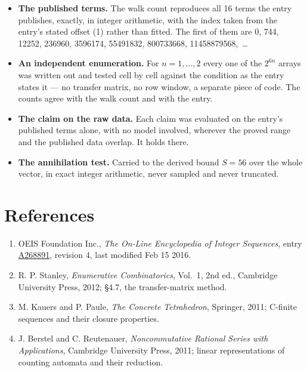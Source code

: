 \documentclass[11pt]{article}
\theoremstyle{definition}
\begin{document}
\begin{itemize}

\item {\bfseries The published terms.} The walk count reproduces all 16 terms the entry publishes, exactly, in integer arithmetic, with the index taken from the entry's stated offset (1) rather than fitted. The first of them are 0, 744, 12252, 236960, 3596174, 55491832, 800733668, 11458879568,~\dots

\item {\bfseries An independent enumeration.} For $n = 1,\dots,2$ every one of the $2^{6n}$ arrays was written out and tested cell by cell against the condition as the entry states it --- no transfer matrix, no row window, a separate piece of code. The counts agree with the walk count and with the entry.

\item {\bfseries The claim on the raw data.} Each claim was evaluated on the entry's published terms alone, with no model involved, wherever the proved range and the published data overlap. It holds there.

\item {\bfseries The annihilation test.} Carried to the derived bound $S = 56$ over the whole vector, in exact integer arithmetic, never sampled and never truncated.

\end{itemize}

\section{References}

\begin{enumerate}

\item OEIS Foundation Inc., \emph{The On-Line Encyclopedia of Integer Sequences}, entry \href{https://oeis.org/A268891}{A268891}, revision 4, last modified Feb 15 2016.

\item R. P. Stanley, \emph{Enumerative Combinatorics}, Vol.~1, 2nd ed., Cambridge University Press, 2012; \S4.7, the transfer-matrix method.

\item M. Kauers and P. Paule, \emph{The Concrete Tetrahedron}, Springer, 2011; C-finite sequences and their closure properties.

\item J. Berstel and C. Reutenauer, \emph{Noncommutative Rational Series with Applications}, Cambridge University Press, 2011; linear representations of counting automata and their reduction.

\end{enumerate}
\end{document}
